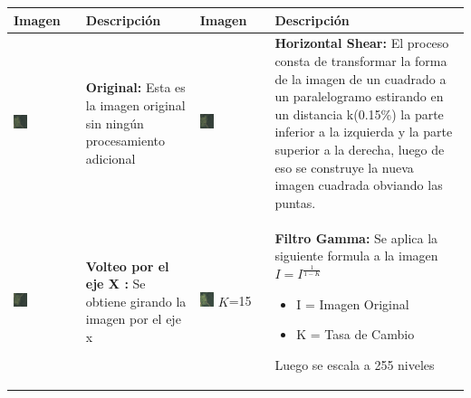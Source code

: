 \begin{table}[H]
\begin{tabular}{|M{0.225\textwidth}|M{0.225\textwidth}|M{0.225\textwidth}|M{0.225\textwidth}|}
\hline
Imagen & Descripción&Imagen & Descripción \\ \hline

\includegraphics[width=0.225\textwidth]{06changedetection/tranformaciones/original.png}          & \scriptsize{\textbf{Original:} Esta es la imagen original sin ningún procesamiento adicional } &\includegraphics[width=0.225\textwidth]{06changedetection/tranformaciones/shear.png}              & \scriptsize{\textbf{Horizontal Shear:} El proceso consta de transformar la forma de la imagen de un cuadrado a un paralelogramo estirando en un distancia k(0.15\%) la parte inferior a la izquierda  y la parte superior a la derecha, luego de eso se construye la nueva imagen cuadrada obviando las puntas.}         \\ \hline



\includegraphics[width=0.225\textwidth]{06changedetection/tranformaciones/arribaAbajo.png}          & \scriptsize{\textbf{Volteo por el eje X :} Se obtiene girando la imagen por el eje x}    &\includegraphics[width=0.225\textwidth]{06changedetection/tranformaciones/gamma.png}     $K$=15         & \scriptsize{\textbf{Filtro Gamma:} Se aplica la siguiente formula a la imagen \smallskip \newline$ I =I^{\frac{1}{1-K}} $ \smallskip \begin{itemize}
\itemsep0em 
 \item I = Imagen Original
 \item K = Tasa de Cambio
\end{itemize}  Luego se escala a 255 niveles }            \\ \hline






\end{tabular}
\end{table}
